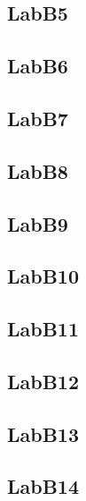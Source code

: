 \documentclass{article}
\begin{document}
\subsection{LabB5}


\subsection{LabB6}


\subsection{LabB7}


\subsection{LabB8}


\subsection{LabB9}

\pagebreak

\subsection{LabB10}

\pagebreak

\subsection{LabB11}


\subsection{LabB12}

\pagebreak

\subsection{LabB13}


\subsection{LabB14}

\pagebreak
\end{document}

